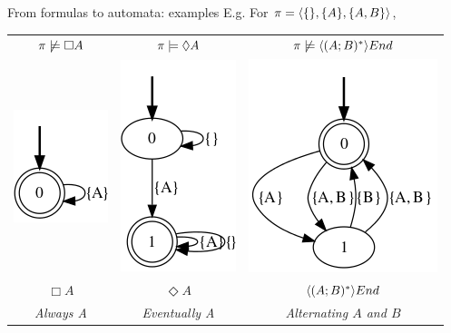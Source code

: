 \documentclass{beamer}
\begin{document}
\begin{frame}{From \LLf formulas to automata: examples}
E.g. For $\pi = \langle \{\}, \{A\}, \{A, B\} \rangle$, 
\begin{table}
	\centering
\begin{tabular}{c c c} 
	$\pi \not\models \Box A$ & $\pi \models \Diamond A$ & $\pi \not\models \langle (A;B)^* \rangle End$\\
    \includegraphics[width=.20\textwidth]{images/ltlf-alwaysA-dfa-no-borders} & \includegraphics[width=.20\textwidth]{images/ltlf-eventuallyA-dfa-no-borders} & \includegraphics[width=.35\textwidth]{images/alternating-sequence-dfa-no-borders} \\
   	$\Box A$ & $\Diamond A$ & $\langle (A;B)^* \rangle End$ \\
   	\emph{Always A} & \emph{Eventually A} & \emph{Alternating $A$ and $B$} \\ 
\end{tabular}\\
\end{table}


%	
\end{frame}
\end{document}
